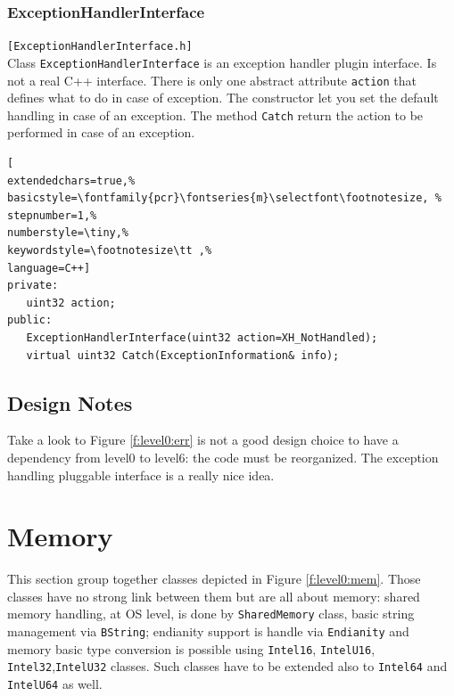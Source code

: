 \subsubsection{ExceptionHandlerInterface}
\texttt{[ExceptionHandlerInterface.h]}\\
Class \texttt{ExceptionHandlerInterface} is an exception handler plugin interface. Is not a real C++ interface. There is only one abstract attribute \texttt{action} that defines what to do in case of exception. The constructor let you set the default handling in case of an exception. The method \texttt{Catch} return the action to be performed in case of an exception.

\begin{lstlisting}[
extendedchars=true,%
basicstyle=\fontfamily{pcr}\fontseries{m}\selectfont\footnotesize, %
stepnumber=1,%
numberstyle=\tiny,%
keywordstyle=\footnotesize\tt ,%
language=C++]
private:
   uint32 action;
public:
   ExceptionHandlerInterface(uint32 action=XH_NotHandled);
   virtual uint32 Catch(ExceptionInformation& info);
\end{lstlisting}



\subsection{Design Notes}
Take a look to Figure \ref{f:level0:err} is not a good design choice to have a dependency from level0 to level6: the code must be reorganized. The exception handling pluggable interface is a really nice idea.



\section{Memory}

This section group together classes depicted in Figure \ref{f:level0:mem}. Those classes have no strong link between them but are all about memory: shared memory handling, at OS level, is done by \texttt{SharedMemory} class, basic string management via \texttt{BString}; endianity support is handle via \texttt{Endianity} and memory basic type conversion is possible using \texttt{Intel16}, \texttt{IntelU16}, \texttt{Intel32},\texttt{IntelU32} classes. Such classes have to be extended also to \texttt{Intel64} and \texttt{IntelU64} as well.

